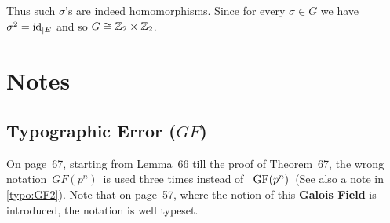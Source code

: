 \begin{myenumerate}
Thus such \(\sigma\)'s are indeed homomorphisms.
Since for every \(\sigma\in G\) we have \(\sigma^2=\mathop{\rm id}\nolimits_{|E}\)
and so \(G \cong \mathbb{Z}_2\times\mathbb{Z}_2\).

\iffalse
let \(w_1,w_2\in E\) have the representations:
\begin{equation*}
w_i = q_{i,1} + \sqrt{2}\cdot q_{i,2} + \sqrt{3}\cdot q_{i,3} +
      \sqrt{2}\sqrt{3}\cdot q_{i,4}.
\qquad\textrm{for}\;(i=1,2)
\end{equation*}
with \(q_{i,j}\in \Q\).

Now
\begin{eqnarray*}
w_1 w_2 & = & (q_{1,1}q_{2,1} + 2q_{1,2}q_{2,2} + 3 q_{1,3}q_{2,3} +
                                                   6q_{1,4}q_{2,4}) + \\
&&            (q_{1,2}q_{2,1} + q_{1,1}q_{2,2} +
               3q_{1,3}q_{2,4} + 3q_{1,4}q_{2,3})\sqrt{2} + \\
&&            (q_{1,3}q_{2,1} + q_{1,1}q_{2,3} +
               2q_{1,2}q_{2,4} + 2q_{1,4}q_{2,2})\sqrt{3} + \\
&&            (q_{1,4}q_{2,1} + q_{1,1}q_{2,4} +
               q_{1,2}q_{2,3} + q_{1,3}q_{2,2})\sqrt{2}\sqrt{3}.
\end{eqnarray*}
\fi

\end{myenumerate}


\section{Notes}

\subsection{Typographic Error (\ensuremath{GF})} \label{typo:GF1}

On page~67, starting from Lemma~66 till the proof of Theorem~67,
the wrong notation
\,\(GF(p^n)\)\,
is used three times instead of
\, \(\mathop{\rm GF}\nolimits(p^n)\)\, (See also a note in \ref{typo:GF2}).
Note that on page~57, where the notion of this
\textbf{Galois Field}
is introduced, the notation is well typeset.

